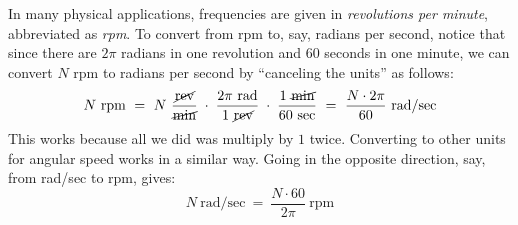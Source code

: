 In many physical applications, frequencies are given in \emph{revolutions per minute}, abbreviated
as \emph{rpm}. To convert from rpm to, say, radians per second, notice that since there
are $2\pi$ radians in one revolution and $60$ seconds in one minute, we can convert $N$ rpm to
radians per second by ``canceling the units'' as follows:
\begin{displaymath}
 N~\text{rpm} ~=~ N~\frac{\cancel{\text{rev}}}{\cancel{\text{min}}} \;\cdot\;
  \frac{2\pi~\text{rad}}{1~\cancel{\text{rev}}}
  \;\cdot\; \frac{1~\cancel{\text{min}}}{60~\text{sec}} ~=~ \frac{N \cdot 2\pi}{60}~\text{rad/sec}
\end{displaymath}
This works because all we did was multiply by $1$ twice. Converting to other units for angular
speed works in a similar way. Going in the opposite direction, say, from rad/sec to rpm, gives:
\begin{displaymath}
 N~\text{rad/sec} ~=~ \frac{N \cdot 60}{2\pi}~\text{rpm}
\end{displaymath}



